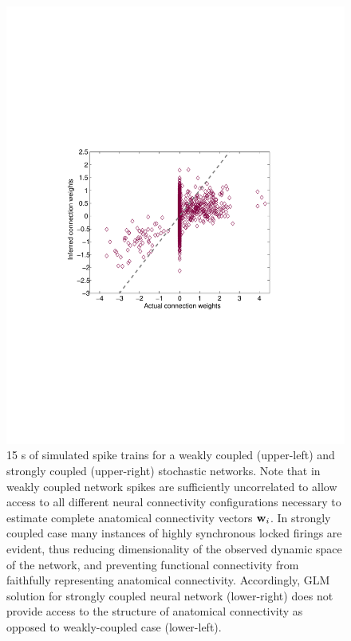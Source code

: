\begin{figure}
\begin{minipage}[c]{0.45\hsize}
\includegraphics[width=\hsize]{../figs/Figure8a_fluor_strong_glm}
\end{minipage}
\caption{15 s of simulated spike trains for a weakly coupled (upper-left)
and strongly coupled (upper-right) stochastic networks. Note that in weakly coupled network spikes are sufficiently uncorrelated to allow access to all different neural connectivity configurations necessary to estimate complete anatomical connectivity vectors ${\bf w}_i$. In strongly coupled case many instances of highly synchronous locked firings are evident, thus reducing dimensionality of the observed dynamic space of the network, and preventing functional connectivity from faithfully representing anatomical connectivity.
Accordingly, GLM solution for strongly coupled neural network (lower-right) does not provide access to the structure of anatomical connectivity as opposed to weakly-coupled case (lower-left).}
\label{fig:rasters}
\end{figure}

